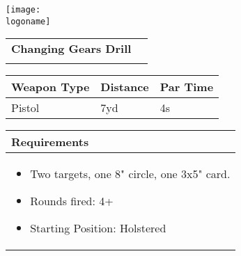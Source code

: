 \documentclass[../Cover.tex]{subfiles}
\begin{document}
	\begin{minipage}[t][0.2\textheight][t]{0.1\textwidth} 
		\texttt{[image: \\logoname]}
	\end{minipage}
	\hfill
	\begin{minipage}[t][0.2\textheight][t]{0.8\textwidth}
		\begin{tabular}{ p{} l  }			
			\\
			\small \textbf{Changing Gears Drill} \\
			\\[0.09\textheight]
		\end{tabular}
		\quad
		\begin{tabular}{ | p{} | p{} | p{} |}
			\hline
			\rowcolor[HTML]{C0C0C0}\tiny Weapon Type & \tiny Distance & \tiny Par Time\\ 
			\hline
			\tiny Pistol & \tiny 7yd & \tiny 4s \\ %
			\hline
		\end{tabular}
	\end{minipage}
	\begin{tabular}{p{}}
		\small Requirements \\
		\hline
		\tiny \begin{itemize} %
			\item Two targets, one 8" circle, one 3x5" card.
			\item Rounds fired: 4+
			\item Starting Position: Holstered 
		\end{itemize}		
		\begin{center}
				
		\end{center}
		\\[0.6\textheight]
	\end{tabular}
\end{document}
